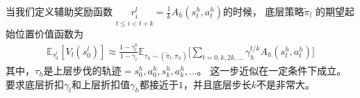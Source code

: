\begin{lemma}
    \label{lemma3}
    当我们定义辅助奖励函数
    $\underset{t\leq  i < t+k}{r_i^l}=\frac{1}{k} A_h(s_t^h,a_t^h)$的时候，
    底层策略$\tilde\pi_l$ 的期望起始位置价值函数为
    \begin{equation}
        \begin{aligned}
         \mathbb{E}_{s_0^l}[V_l(s_0^l)] \approx \frac{1-\gamma_l^k}{1-\gamma_l}\mathbb{E}_{\tau_h\sim(\tilde\pi_l,\pi_h)}\Bigg[\sum_{t=0,k,2k,...}\gamma_h^{t/k}A_h(s_t^h, a_t^h)\Bigg]
        \end{aligned}
    \end{equation}
    其中，$\tau_h$是上层步伐的轨迹$ = s_0^h,a_0^h,s_k^h,a_k^h,...$。
    这一步近似在一定条件下成立。要求底层折扣$\gamma_l$和上层折扣值$\gamma_h$都接近于$1$，并且底层步长$k$不是非常大。
\end{lemma}
